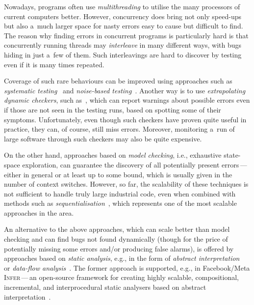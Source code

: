 \documentclass[runningheads]{llncs}
\begin{document}
Nowadays, programs often use \emph{multithreading} to utilise the many
processors of current computers better. However, concurrency does bring not
only speed-ups but also a~much larger space for nasty errors easy to cause
but difficult to find. The reason why finding errors in concurrent programs
is particularly hard is that concurrently running threads may
\emph{interleave} in many different ways, with bugs hiding in just a~few of
them. Such interleavings are hard to discover by testing even if
it is many times repeated.

Coverage of such rare behaviours can be improved using approaches such
as \emph{systematic testing}~\cite{schedspec12} and \emph{noise-based
testing}~\cite{contestframework03,noise15,anaconda}.
Another way is to use \emph{extrapolating dynamic checkers}, such
as~\cite{fasttrack09,velodrome08}, which can report warnings about possible
errors even if those are not seen in the testing runs, based on spotting
some of their symptoms. Unfortunately, even though such checkers have
proven quite useful in practice, they can, of course, still miss errors.
Moreover, monitoring a~run of large software through such checkers may also
be quite expensive.

On the other hand, approaches based on \emph{model checking}, i.e., exhaustive
state-space exploration, can guarantee the discovery of all potentially
present errors\,---\,either in general or at least up to some bound, which
is usually given in the number of context switches. However, so far, the
scalability of these techniques is not sufficient to handle truly large
industrial code, even when combined with methods such as
\emph{sequentialisation}~\cite{lal-reps-08,lazy-seq-16}, which represents
one of the most scalable approaches in the area.

\enlargethispage{4mm}


An alternative to the above approaches, which can scale better than model
checking and can find bugs not found dynamically (though for the price of
potentially missing some errors and/or producing false alarms), is offered by
approaches based on \emph{static analysis}, e.g., in the form of \emph{abstract
interpretation}~\cite{ai77} or \emph{data-flow analysis}~\cite{dfa73}. The
former approach is supported, e.g., in Facebook/Meta \textsc{Infer}\,---\,an
open-source framework for creating highly scalable, compositional,
incremental, and interprocedural static analysers based on abstract
interpretation~\cite{inferNFM15}.
\end{document}
